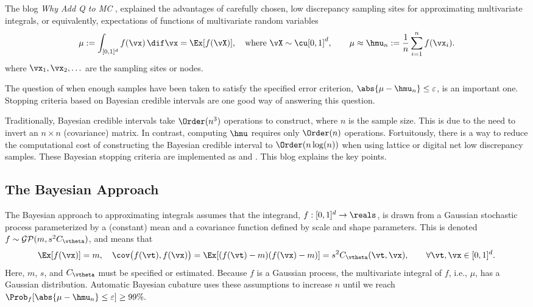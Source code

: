 The blog \emph{Why Add Q to MC} \cite{fredblogqtomc2020},  explained the advantages of carefully chosen, low discrepancy sampling sites for approximating multivariate integrals, or equivalently, expectations of functions of multivariate random variables
\[
\mu:  = \int_{[0,1]^d} f(\vx) \, \dif \vx = \Ex[f(\vX)], \quad \text{where } \vX \sim \cu[0,1]^d, \qquad \mu \approx \hmu_n : = \frac 1n \sum_{i=1}^n f(\vx_i).
\]
where $\vx_1, \vx_2, \ldots$ are the sampling sites or nodes.

The question of when enough samples have been taken to satisfy the specified error criterion, $\abs{\mu - \hmu_n} \le \varepsilon$, is an important one.  Stopping criteria based on Bayesian credible intervals are one good way of answering this question.

Traditionally, Bayesian credible intervals take $\Order(n^3)$ operations to construct, where $n$ is the sample size.  This is due to the need to invert an $n \times n$ (covariance) matrix.  In contrast, computing $\hmu$ requires only $\Order(n)$ operations.  Fortuitously, there is a way to reduce the computational cost of constructing the Bayesian credible interval to $\Order(n \log (n))$ when using lattice or digital net low discrepancy samples. These Bayesian stopping criteria are implemented as  and  \cite{QMCPy2020a}. This blog explains the key points.

\subsection*{The Bayesian Approach}
The Bayesian approach to approximating integrals assumes that the integrand, $f:[0,1]^d \to \reals$, is drawn from a Gaussian stochastic process parameterized by a (constant) mean and a covariance function defined by scale and shape parameters.  This is denoted $f \sim \mathcal{GP}(m,s^2 C_{\vtheta})$, and means that 
\[
\Ex[f(\vx)] = m, \quad \cov\bigl(f(\vt),f(\vx) \bigr) = \Ex[(f(\vt) - m)(f(\vx) - m)] = s^2 C_{\vtheta}(\vt,\vx), \qquad \forall \vt, \vx \in [0,1]^d.
\]
Here, $m$, $s$, and $C_\vtheta$ must be specified or estimated.  Because $f$ is a Gaussian process, the multivariate integral of $f$, i.e., $\mu$, has a Gaussian distribution.  Automatic Bayesian cubature uses these assumptions to increase $n$ until we reach
$
\Prob_f  [\abs{ \mu - \hmu_n} \le \varepsilon ] \ge 99\%.
$

